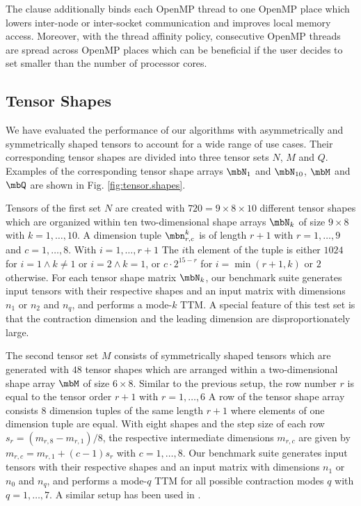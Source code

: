 The  clause additionally binds each OpenMP thread to one OpenMP place which lowers inter-node or inter-socket communication and improves local memory access.
Moreover, with the  thread affinity policy, consecutive OpenMP threads are spread across OpenMP places which can be beneficial if the user decides to set  smaller than the number of processor cores.

 

\subsection{Tensor Shapes} 
We have evaluated the performance of our algorithms with asymmetrically and symmetrically shaped tensors to account for a wide range of use cases.
Their corresponding tensor shapes are divided into three tensor sets $N$, $M$ and $Q$.
Examples of the corresponding tensor shape arrays $\mbN_1$ and $\mbN_{10}$, $\mbM$ and $\mbQ$ are shown in Fig. \ref{fig:tensor.shapes}.

Tensors of the first set $N$ are created with $720 = 9\times 8 \times 10$ different tensor shapes which are organized within ten two-dimensional shape arrays $\mbN_k$ of size $9 \times 8$ with $k=1,\dots,10$.
A dimension tuple $\mbn_{r,c}^k$ is of length $r+1$ with $r = 1,\dots,9$ and $c = 1,\dots,8$.
With $i = 1,\dots,r+1$ The $i$th element of the tuple is either $1024$ for $i = 1 \wedge k \neq 1$ or $i = 2 \wedge k = 1$, or $c \cdot 2^{15-r}$ for $i = \min(r+1,k)$ or $2$ otherwise.
For each tensor shape matrix $\mbN_k$, our benchmark suite generates input tensors with their respective shapes and an input matrix with dimensions $n_1$ or $n_2$ and $n_q$, and performs a mode-$k$ TTM.
A special feature of this test set is that the contraction dimension and the leading dimension are disproportionately large.

The second tensor set $M$ consists of symmetrically shaped tensors which are generated with $48$ tensor shapes which are arranged within a two-dimensional shape array $\mbM$ of size $6 \times 8$.
Similar to the previous setup, the row number $r$ is equal to the tensor order $r+1$ with $r=1,\dots,6$
A row of the tensor shape array consists $8$ dimension tuples of the same length $r+1$ where elements of one dimension tuple are equal.
With eight shapes and the step size of each row $s_r = (m_{r,8}-m_{r,1})/8$, the respective intermediate dimensions $m_{r,c}$ are given by $m_{r,c} = m_{r,1} + (c-1) s_r$ with $c=1,\dots,8$.
Our benchmark suite generates input tensors with their respective shapes and an input matrix with dimensions $n_1$ or $n_0$ and $n_q$, and performs a mode-$q$ TTM for all possible contraction modes $q$ with $q=1,\dots,7$.
A similar setup has been used in \cite{bassoy:2019:ttv, bassoy:2018:fast}.


